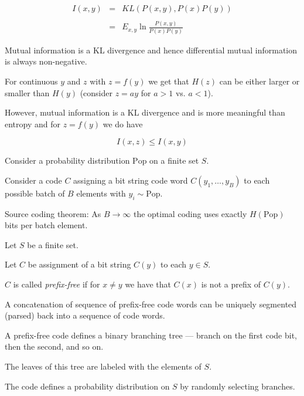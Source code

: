 
\begin{eqnarray*}
  I(x,y) & = & KL(P(x,y),P(x)P(y)) \\
  \\
  & = & E_{x,y} \ln \frac{P(x,y)}{P(x)P(y)}
\end{eqnarray*}

\vfill
Mutual information is a KL divergence and hence differential mutual information is always non-negative.


For continuous $y$ and $z$ with $z = f(y)$ we get that $H(z)$ can be either larger or smaller than $H(y)$ (consider $z = ay$ for $a >1$ vs. $a<1$).

\vfill
However, mutual information is a KL divergence and is more meaningful than entropy and for $z = f(y)$ we do have

$$I(x,z) \leq I(x,y)$$


Consider a probability distribution $\mathrm{Pop}$ on a finite set $S$.

\vfill
Consider a code $C$ assigning a bit string code word $C(y_1,\ldots,y_B)$ to each possible batch of $B$ elements with $y_i \sim \mathrm{Pop}$.

\vfill
Source coding theorem: As $B \rightarrow \infty$ the optimal coding uses exactly $H(\mathrm{Pop})$
bits per batch element.


Let $S$ be a finite set.

\vfill
Let $C$ be assignment of a bit string $C(y)$ to each $y \in S$.

\vfill
$C$ is called {\em prefix-free} if for $x \not = y$ we have that $C(x)$ is not a prefix of $C(y)$.

\vfill
A concatenation of sequence of prefix-free code words can be uniquely segmented (parsed) back into a sequence of code words.


A prefix-free code defines a binary branching tree --- branch on the first code bit, then the second, and so on.

\vfill
The leaves of this tree are labeled with the elements of $S$.

\vfill
The code defines a probability distribution on $S$ by randomly selecting branches.

